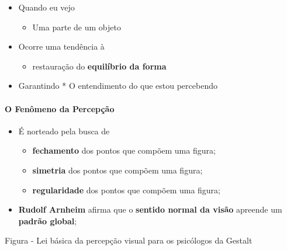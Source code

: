 \documentclass[
]{book}
\providecommand{\tightlist}{%
  \setlength{\itemsep}{0pt}\setlength{\parskip}{0pt}}
\begin{document}
\begin{itemize}
\tightlist
\item
  Quando eu vejo

  \begin{itemize}
  \tightlist
  \item
    Uma parte de um objeto
  \end{itemize}
\item
  Ocorre uma tendência à

  \begin{itemize}
  \tightlist
  \item
    restauração do \textbf{equilíbrio da forma}
  \end{itemize}
\item
  Garantindo
  * O entendimento do que estou percebendo
\end{itemize}

\hypertarget{o-fenuxf4meno-da-percepuxe7uxe3o}{%
\paragraph{O Fenômeno da Percepção}\label{o-fenuxf4meno-da-percepuxe7uxe3o}}

\begin{itemize}
\tightlist
\item
  É norteado pela busca de

  \begin{itemize}
  \tightlist
  \item
    \textbf{fechamento} dos pontos que compõem uma figura;
  \item
    \textbf{simetria} dos pontos que compõem uma figura;
  \item
    \textbf{regularidade} dos pontos que compõem uma figura;
  \end{itemize}
\item
  \textbf{Rudolf Arnheim} afirma que o \textbf{sentido normal da visão} apreende um \textbf{padrão global};
\end{itemize}

Figura - Lei básica da percepção visual para os psicólogos da Gestalt
\end{document}
